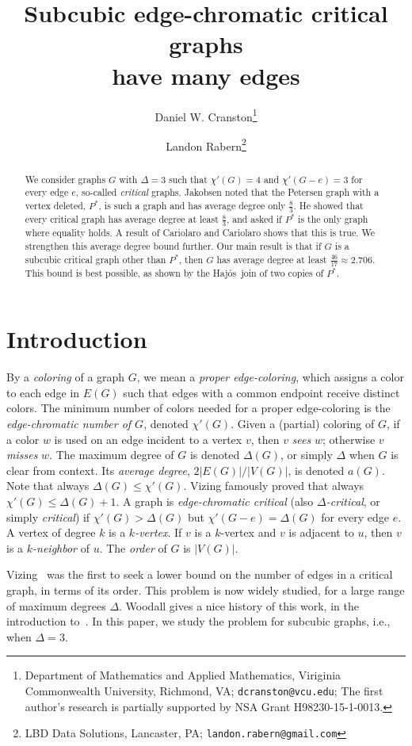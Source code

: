 \documentclass[12pt]{article}
\author{Daniel W. Cranston\thanks{Department of Mathematics and Applied
Mathematics, Viriginia Commonwealth University, Richmond, VA;
\texttt{dcranston@vcu.edu}; 
The first author's research is partially supported by NSA Grant
H98230-15-1-0013.}
\and
Landon Rabern\thanks{LBD Data Solutions, Lancaster, PA;
\texttt{landon.rabern@gmail.com}}
}
\title{Subcubic edge-chromatic critical graphs\\ have many edges}
\theoremstyle{plain}
\theoremstyle{definition}
\theoremstyle{remark}
\def\hajos{Haj\'{o}s}
\begin{document}
\maketitle
\begin{abstract}
We consider graphs $G$ with $\Delta=3$ such that $\chi'(G)=4$ and $\chi'(G-e)=3$ for
every edge $e$, so-called \emph{critical} graphs.  Jakobsen noted that the
Petersen graph with a vertex deleted,
$P^*$, is such a graph and has average degree only $\frac83$.  He showed
that every critical graph has average degree at least $\frac83$, and asked if
$P^*$ is the only graph where equality holds.  A result of Cariolaro and
Cariolaro shows that this is true.  We strengthen this average degree bound further.
Our main result is that if $G$ is a subcubic
critical graph other than $P^*$, then 
$G$ has average degree at least
$\frac{46}{17}\approx2.706$.
This bound is best possible, as shown by the \hajos\ join of two copies of
$P^*$.
\end{abstract}
\section{Introduction}

By a \emph{coloring} of a graph $G$, we mean
a \emph{proper edge-coloring}, which assigns a color to each edge in
$E(G)$ such that edges with a common endpoint receive distinct colors.  
The minimum number of colors needed for a proper edge-coloring is the
\emph{edge-chromatic number of $G$}, denoted $\chi'(G)$.  
Given a (partial) coloring of $G$,
if a color $w$ is used on an edge incident to a vertex $v$, then 
$v$ \emph{sees} $w$; otherwise $v$ \emph{misses} $w$.
The maximum degree of
$G$ is denoted $\Delta(G)$, or simply $\Delta$ when $G$ is clear from context. 
Its \emph{average degree}, $2|E(G)|/|V(G)|$, is denoted $a(G)$.
Note that always $\Delta(G)\le \chi'(G)$.  Vizing famously proved that always
$\chi'(G)\le \Delta(G)+1$.  A graph is
\emph{edge-chromatic critical} (also \emph{$\Delta$-critical}, or simply
\emph{critical}) if $\chi'(G)>\Delta(G)$ but $\chi'(G-e)=\Delta(G)$ for every
edge $e$.  
A vertex of degree $k$ is a \emph{$k$-vertex}.  
If $v$ is a $k$-vertex and $v$ is adjacent to $u$, then $v$ is a
\emph{$k$-neighbor} of $u$.  The \emph{order} of $G$ is $|V(G)|$.

Vizing~\cite{Vizing65,Vizing68} was the first to seek a lower bound on the
number of edges in a
critical graph, in terms of its order.  This problem is now widely
studied, for a large range of maximum degrees $\Delta$.  Woodall gives
a nice history of this work, in the introduction to~\cite{Woodall08}.
In this paper, we study the problem for subcubic graphs, i.e., when $\Delta=3$.
\end{document}
